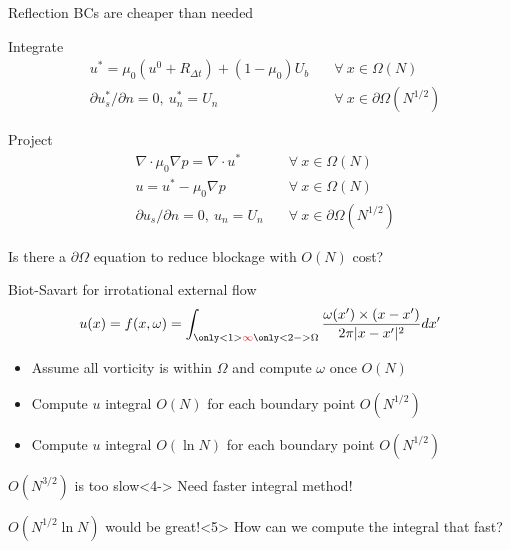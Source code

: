 \documentclass[aspectratio=169,small]{beamer}
\begin{document}
\begin{frame}[fragile]{Reflection BCs are cheaper than needed} %
  \begin{block}{Integrate}
      \begin{align*}
        &u^* = \mu_0(u^0+R_{\Delta t})+(1-\mu_0)U_b &\quad\forall\ x\in\Omega (N) \\
        &\partial u^*_s/\partial n = 0,\ u^*_n = U_n &\quad\forall\ x\in\partial\Omega (N^{1/2})
      \end{align*}
  \end{block}
  \begin{block}{Project}
      \begin{align*}
          &\nabla\cdot\mu_0\nabla p = \nabla\cdot u^* &\quad\forall\ x\in\Omega (N)\\
          &u = u^*-\mu_0\nabla p &\quad\forall\ x\in\Omega (N)\\
          &\partial u_s/\partial n = 0,\ u_n = U_n &\quad\forall\ x\in\partial\Omega (N^{1/2})
      \end{align*}
  \end{block}
  Is there a $\partial\Omega$ equation to reduce blockage with $O(N)$ cost?
\end{frame}

\begin{frame}[fragile]{Biot-Savart for irrotational external flow} %
    \begin{align*}
      u(x) = f(x,\omega) = \int_{\only<1>{\color{red}\infty}\only<2->\Omega} \frac{\omega(x')\times(x-x')}{2\pi|x-x'|^2}dx'\\
    \end{align*}
    \vspace{-1cm}
    \begin{itemize}
      \item<2-> Assume all vorticity is within $\Omega$ and compute $\omega$ once $O(N)$
      \item<3-> Compute $u$ integral $O(N)$ for each boundary point $O(N^{1/2})$
      \item<5> Compute $u$ integral {\color{teal}$O(\ln N)$} for each boundary point $O(N^{1/2})$
    \end{itemize}
  \begin{alertblock}{$O(N^{3/2})$ is too slow}<4->
     Need faster integral method!
  \end{alertblock}
  \begin{exampleblock}{$O(N^{1/2}\ln N )$ would be great!}<5>
     How can we compute the integral that fast?
  \end{exampleblock}
\end{frame}
\end{document}
